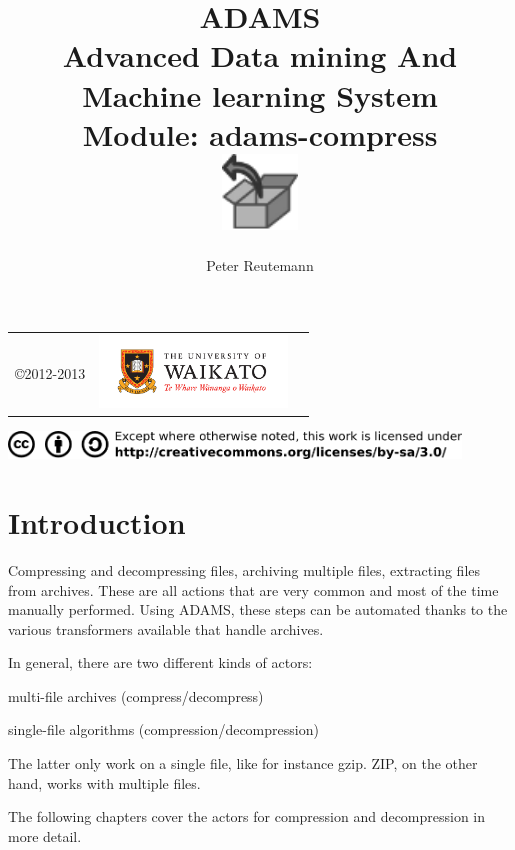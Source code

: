 \documentclass[a4paper]{book}
\title{
  \textbf{ADAMS} \\
  {\Large \textbf{A}dvanced \textbf{D}ata mining \textbf{A}nd \textbf{M}achine
  learning \textbf{S}ystem} \\
  {\Large Module: adams-compress} \\
  \vspace{1cm}
  \includegraphics[width=2cm]{images/compress-module.png} \\
}
\author{
  Peter Reutemann
}
\begin{document}
\begin{titlepage}
\maketitle

\thispagestyle{empty}
\center
\begin{table}[b]
	\begin{tabular}{c l l}
		\parbox[c][2cm]{2cm}{\copyright 2012-2013} &
		\parbox[c][2cm]{5cm}{\includegraphics[width=5cm]{images/coat_of_arms.pdf}} \\
	\end{tabular}
	\includegraphics[width=12cm]{images/cc.png} \\
\end{table}

\end{titlepage}

\tableofcontents

\chapter{Introduction}
Compressing and decompressing files, archiving multiple files, extracting files
from archives. These are all actions that are very common and most of the time
manually performed. Using ADAMS, these steps can be automated thanks to the 
various transformers available that handle archives.

In general, there are two different kinds of actors:
\begin{tight_itemize}
  \item multi-file archives (compress/decompress)
  \item single-file algorithms (compression/decompression)
\end{tight_itemize}
The latter only work on a single file, like for instance gzip. ZIP, on the
other hand, works with multiple files.

The following chapters cover the actors for compression and decompression in 
more detail.
\end{document}
